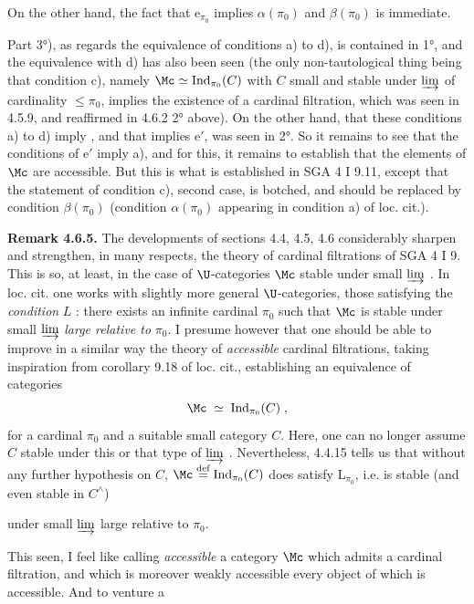 
On the other hand, the fact that $\mathrm{e}_{\pi_0}$ implies $\alpha(\pi_0)$ and $\beta(\pi_0)$ is immediate.

Part 3°), as regards the equivalence of conditions a) to d), is contained in 1°, and the equivalence with d) has also been seen (the only non-tautological thing being that condition c), namely $\Mc \simeq \mathrm{Ind}_{\pi_0}(C)$ with $C$ small and stable under $\varinjlim$ of cardinality $\leqslant \pi_0$, implies the existence of a cardinal filtration, which was seen in 4.5.9, and reaffirmed in 4.6.2 2° above). On the other hand, that these conditions a) to d) imply  , and that  implies e$'$, was seen in 2°. So it remains to see that the conditions of e$'$ imply a), and for this, it remains to establish that the elements of $\Mc$ are accessible. But this is what is established in SGA 4 I 9.11, except that the statement of condition c), second case, is botched, and should be replaced by condition $\beta(\pi_0)$ (condition $\alpha(\pi_0)$ appearing in condition a) of loc. cit.).


\textbf{Remark 4.6.5.} The developments of sections 4.4, 4.5, 4.6 considerably sharpen and strengthen, in many respects, the theory of cardinal filtrations of SGA 4 I 9. This is so, at least, in the case of $\U$-categories $\Mc$ stable under small $\varinjlim$ . In loc. cit. one works with slightly more general $\U$-categories, those satisfying
the \textit{condition} $L$ : there exists an infinite cardinal $\pi_0$ such that $\Mc$ is stable under small $\varinjlim$ \textit{large relative to} $\pi_0$. I presume however that one should be able to improve in a similar way the theory of \textit{accessible} cardinal filtrations, taking inspiration from corollary 9.18 of loc. cit., establishing an equivalence of categories
\[
\Mc \;\simeq\; \mathrm{Ind}_{\pi_0}(C)\;,
\]
for a cardinal $\pi_0$ and a suitable small category $C$. Here, one can no longer assume $C$ stable under this or that type of $\varinjlim$ . Nevertheless, 4.4.15 tells us that without any further hypothesis on $C$, $\Mc \overset{\text{def}}{=} \mathrm{Ind}_{\pi_0}(C)$ does satisfy $\mathrm{L}_{\pi_0}$, i.e. is stable (and even stable in $C^{\wedge}$)


under small $\varinjlim$ large relative to $\pi_0$.

This seen, I feel like calling \textit{accessible} a category $\Mc$ which admits a cardinal filtration, and which is moreover weakly accessible every object of which is accessible. And to venture a %

